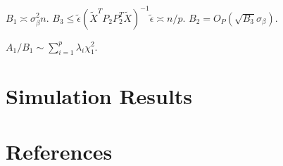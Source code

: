 \documentclass[review]{elsarticle}
\theoremstyle{plain}
\theoremstyle{definition}
\theoremstyle{remark}
\begin{document}
$B_1\asymp \sigma^2_\beta n$. $B_3 \leq \tilde{\epsilon}{(\tilde{X}^T P_2 P_2^T\tilde{X})}^{-1}\tilde{\epsilon}\asymp n/p$. $B_2=O_P(\sqrt{B_3}\sigma_\beta)$.


$A_1/B_1\sim \sum_{i=1}^p \lambda_i \chi^2_1$.



\section{Simulation Results}


\section*{References}

\end{document}

